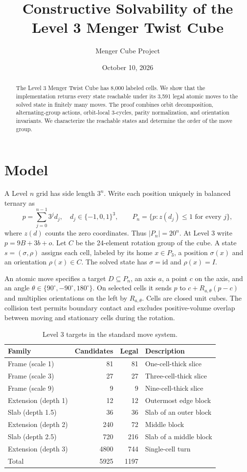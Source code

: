\documentclass[a4paper,11pt]{article}
\title{Constructive Solvability of the Level 3 Menger Twist Cube}
\author{Menger Cube Project}
\date{October 10, 2026}
\theoremstyle{definition}
\newcommand{\code}[1]{\path{#1}}
\begin{document}
\maketitle
\begin{abstract}
The Level 3 Menger Twist Cube has 8,000 labeled cells. We show that the
\code{level3-slice-reduction} implementation returns every state reachable
under its 3,591 legal atomic moves to the solved state in finitely many moves.
The proof combines orbit decomposition, alternating-group actions,
orbit-local 3-cycles, parity normalization, and orientation invariants.
We characterize the reachable states and determine the order of the move group.
\end{abstract}
\tableofcontents

\section{Model}
A Level $n$ grid has side length $3^n$. Write each position uniquely in
balanced ternary as
\[
p=\sum_{j=0}^{n-1}3^j d_j,\quad d_j\in\{-1,0,1\}^3,\qquad
P_n=\{p:z(d_j)\le1\text{ for every }j\},
\]
where $z(d)$ counts the zero coordinates. Thus $|P_n|=20^n$. At Level 3
write $p=9B+3b+o$.
Let $C$ be the 24-element rotation group of the cube. A state
$s=(\sigma,\rho)$ assigns each cell, labeled by its home $x\in P_3$,
a position $\sigma(x)$ and an orientation $\rho(x)\in C$.
The solved state has $\sigma=\mathrm{id}$ and $\rho(x)=I$.

An atomic move specifies a target $D\subseteq P_n$, an axis $a$, a point
$c$ on the axis, and an angle $\theta\in\{90^\circ,-90^\circ,180^\circ\}$.
On selected cells it sends $p$ to $c+R_{a,\theta}(p-c)$ and multiplies
orientations on the left by $R_{a,\theta}$. Cells are closed unit cubes.
The collision test permits boundary contact and excludes positive-volume
overlap between moving and stationary cells during the rotation.

\begin{table}[ht]
\centering
\caption{Level 3 targets in the standard move system.}
\begin{tabular}{lrrl}
\toprule
Family & Candidates & Legal & Description\\
\midrule
Frame (scale 1) &81&81& One-cell-thick slice\\
Frame (scale 3) &27&27& Three-cell-thick slice\\
Frame (scale 9) &9&9& Nine-cell-thick slice\\
Extension (depth 1) &12&12& Outermost edge block\\
Slab (depth 1.5) &36&36& Slab of an outer block\\
Extension (depth 2) &240&72& Middle block\\
Slab (depth 2.5) &720&216& Slab of a middle block\\
Extension (depth 3) &4800&744& Single-cell turn\\
\midrule
Total&5925&1197&\\
\bottomrule
\end{tabular}
\end{table}
\end{document}
